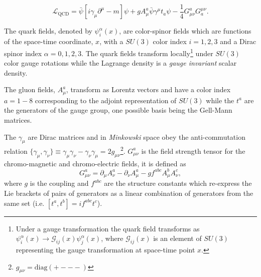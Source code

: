 \begin{equation}
\mathcal{L}_{\mathrm{QCD}} = \bar{\psi}\left[i \gamma_\mu \partial^\mu - m\right]\psi + g  A_\mu^a\bar{\psi}\gamma^\mu t_a\psi - \frac{1}{4}G_{\mu\nu}^aG^{\mu\nu}_a.
\end{equation}

The quark fields, denoted by $\psi^\alpha_i(x)$,  are color-spinor fields which are functions of the space-time coordinate, $x$, with a $SU(3)$ color index $i=1,2,3$ and a Dirac spinor index $\alpha=0,1,2,3$. The quark fields transform locally\footnote{Under a gauge transformation the quark field transforms as $\psi^\alpha_i(x) \rightarrow \mathcal{G}_{ij}(x)\psi^\alpha_j(x)$, where $\mathcal{G}_{ij}(x)$ is an element of $SU(3)$ representing the gauge transformation at space-time point $x$.} under $SU(3)$ color gauge rotations while the Lagrange density is a \emph{gauge invariant} scalar density. 

The gluon fields, $A_\mu^a$, transform as Lorentz vectors and have a color index $a=1-8$ corresponding to the adjoint representation of $SU(3)$ while the $t^a$ are the generators of the gauge group, one possible basis being the Gell-Mann matrices. 

The $\gamma_\mu$ are Dirac matrices and in \emph{Minkowski} space obey the anti-commutation relation $\{\gamma_\mu,\gamma_\nu\} \equiv \gamma_\mu\gamma_\nu - \gamma_\nu\gamma_\mu = 2g_{\mu\nu}$\footnote{$g_{\mu\nu}=\mathrm{diag}(+---)$}.  $G_{\mu\nu}^a$ is the field strength tensor for the chromo-magnetic and chromo-electric fields, it is defined as 
\begin{equation*}
G_{\mu\nu}^a = \partial_\mu A_\nu^a - \partial_\nu A_\mu^a - gf^{abc}A^b_\mu A^c_\nu,
\end{equation*}
where $g$ is the coupling and $f^{abc}$ are the structure constants which re-express the Lie brackets of pairs of generators as a linear combination of generators from the same set (i.e. $\left[t^a,t^b\right] = i f^{abc}t^c$).

